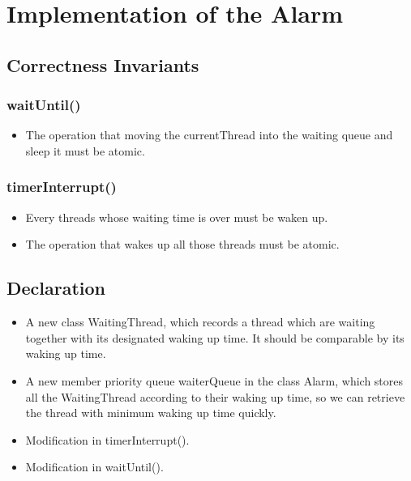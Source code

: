 \documentclass{article}
\begin{document}
	\section{Implementation of the Alarm}
	
	\subsection{Correctness Invariants}
	
	\subsubsection*{waitUntil()}
	\begin{itemize}
		\item The operation that moving the currentThread into the waiting queue and sleep it must be atomic.
	\end{itemize}
	
	\subsubsection*{timerInterrupt()}
	\begin{itemize}
		\item Every threads whose waiting time is over must be waken up.
		
		\item The operation that wakes up all those threads must be atomic.
	\end{itemize}
	
	\subsection{Declaration}
	
	\begin{itemize}
		\item A new class WaitingThread, which records a thread which are waiting together with its designated waking up time. It should be comparable by its waking up time.
		
		\item A new member priority queue waiterQueue in the class Alarm, which stores all the WaitingThread according to their waking up time, so we can retrieve the thread with minimum waking up time quickly.
		
		\item Modification in timerInterrupt().
		
		\item Modification in waitUntil().
	\end{itemize}
	
\end{document}
